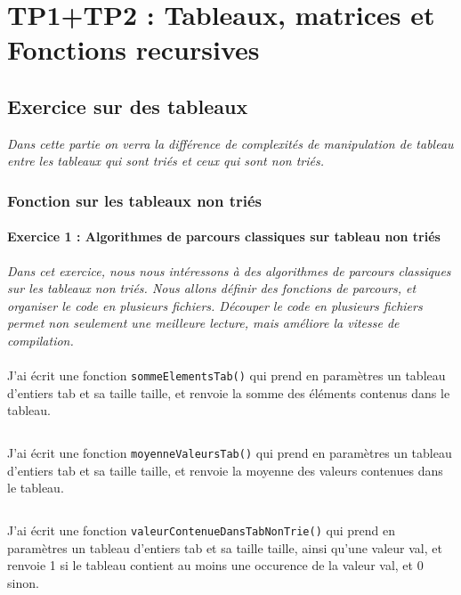 \chapter{TP1+TP2 : Tableaux, matrices et Fonctions recursives}

\section{Exercice sur des tableaux}
\textit{Dans cette partie on verra la différence de complexités de manipulation de tableau entre les tableaux qui sont triés et ceux qui sont non triés.}

\subsection{Fonction sur les tableaux non triés}

\subsubsection{Exercice 1 : Algorithmes de parcours classiques sur tableau non triés}
\textit{Dans cet exercice, nous nous intéressons à des algorithmes de parcours classiques sur les tableaux non triés. Nous allons définir des fonctions de parcours, et organiser le code en plusieurs fichiers. Découper le code en plusieurs fichiers permet non seulement une meilleure lecture, mais améliore la vitesse de compilation.}
\\\\
J'ai écrit une fonction \texttt{sommeElementsTab()} qui prend en paramètres un tableau d’entiers tab et sa taille taille, et renvoie la somme des éléments contenus dans le tableau.
\inputminted[linenos,firstline=7,lastline=14]{cpp}{../sources/cpp/TP1-2/manipTableauxNonTries.c}

J'ai écrit une fonction \texttt{moyenneValeursTab()} qui prend en paramètres un tableau d’entiers tab et sa taille taille, et renvoie la moyenne des valeurs contenues dans le tableau.
\inputminted[linenos,firstline=16,lastline=18]{cpp}{../sources/cpp/TP1-2/manipTableauxNonTries.c}

J'ai écrit une fonction \texttt{valeurContenueDansTabNonTrie()} qui prend en paramètres un tableau d’entiers tab et sa taille taille, ainsi qu’une valeur val, et renvoie 1 si le tableau contient au moins une occurence de la valeur val, et 0 sinon.
\inputminted[linenos,firstline=20,lastline=28]{cpp}{../sources/cpp/TP1-2/manipTableauxNonTries.c}

